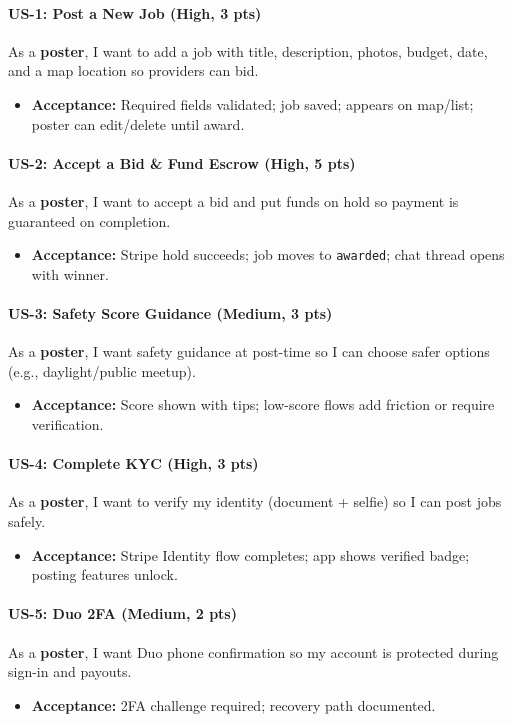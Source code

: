 \documentclass[11pt]{article}
\begin{document}
\paragraph{US-1: Post a New Job (High, 3 pts)}
As a \textbf{poster}, I want to add a job with title, description, photos, budget, date, and a map location so providers can bid.
\begin{itemize}[leftmargin=1.4em]
  \item \textbf{Acceptance:} Required fields validated; job saved; appears on map/list; poster can edit/delete until award.
\end{itemize}

\paragraph{US-2: Accept a Bid \& Fund Escrow (High, 5 pts)}
As a \textbf{poster}, I want to accept a bid and put funds on hold so payment is guaranteed on completion.
\begin{itemize}[leftmargin=1.4em]
  \item \textbf{Acceptance:} Stripe hold succeeds; job moves to \texttt{awarded}; chat thread opens with winner.
\end{itemize}

\paragraph{US-3: Safety Score Guidance (Medium, 3 pts)}
As a \textbf{poster}, I want safety guidance at post-time so I can choose safer options (e.g., daylight/public meetup).
\begin{itemize}[leftmargin=1.4em]
  \item \textbf{Acceptance:} Score shown with tips; low-score flows add friction or require verification.
\end{itemize}

\paragraph{US-4: Complete KYC (High, 3 pts)}
As a \textbf{poster}, I want to verify my identity (document + selfie) so I can post jobs safely.
\begin{itemize}[leftmargin=1.4em]
  \item \textbf{Acceptance:} Stripe Identity flow completes; app shows verified badge; posting features unlock.
\end{itemize}

\paragraph{US-5: Duo 2FA (Medium, 2 pts)}
As a \textbf{poster}, I want Duo phone confirmation so my account is protected during sign-in and payouts.
\begin{itemize}[leftmargin=1.4em]
  \item \textbf{Acceptance:} 2FA challenge required; recovery path documented.
\end{itemize}
\end{document}
